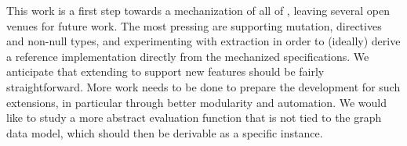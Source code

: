 This work is a first step towards a mechanization of all of \gql, leaving several  open venues for future work. The most pressing are supporting mutation, directives and non-null types, and experimenting with extraction in order to (ideally) derive a reference implementation directly from the mechanized specifications. We anticipate that extending \gcoql to support new features should be fairly straightforward. More work needs to be done to prepare the \coq development for such extensions, in particular through better modularity and automation.
%
We would like to study a more abstract evaluation function that is not tied to the graph data model, which should then be derivable as a specific instance. 

